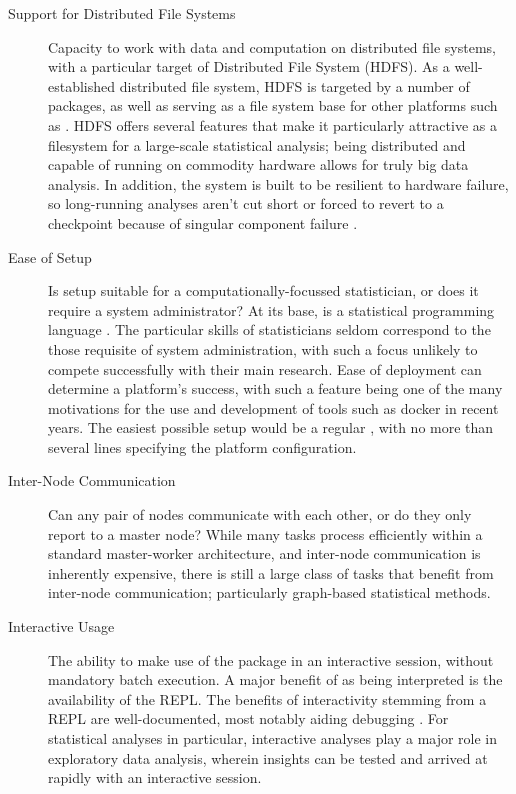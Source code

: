 \begin{description}
	\item[Support for Distributed File Systems]
		Capacity to work with data and computation on distributed file systems,
		with a particular target of 
		Distributed File System (HDFS).
		As a well-established distributed file system, HDFS is targeted by a number of \R{} packages, as well as serving as a file system base for other platforms such as  \cite{analytics:_rhadoop_wiki} \cite{deltarho:_rhipe}\cite{urbanek20}\cite{zaharia2016apache}.
		HDFS offers several features that make it particularly attractive as a filesystem for a large-scale statistical analysis; being distributed and capable of running on commodity hardware allows for truly big data analysis.
		In addition, the system is built to be resilient to hardware failure, so long-running analyses aren't cut short or forced to revert to a checkpoint because of singular component failure \cite{shvachko2010hadoop}.
	\item[Ease of Setup]
		Is setup suitable for a computationally-focussed statistician, or does
		it require a system administrator?
		At its base, \R{} is a statistical programming language \cite{rcore2020intro}.
		The particular skills of statisticians seldom correspond to the those requisite of system administration, with such a focus unlikely to compete successfully with their main research.
		Ease of deployment can determine a platform's success, with such a feature being one of the many motivations for the use and development of tools such as docker in recent years.
		The easiest possible setup would be a regular , with no more than several lines specifying the platform configuration.
	\item[Inter-Node Communication]
		Can any pair of nodes communicate with each other, or do they only
		report to a master node?
		While many tasks process efficiently within a standard master-worker architecture, and inter-node communication is inherently expensive, there is still a large class of tasks that benefit from inter-node communication\cite{walker1996mpi}; particularly graph-based statistical methods.
	\item[Interactive Usage]
		The ability to make use of the package in an interactive \R{} session,
		without mandatory batch execution.
		A major benefit of \R{} as being interpreted is the availability of the REPL.
		The benefits of interactivity stemming from a REPL are well-documented, most notably aiding debugging \cite{mccarthy1978history}.
		For statistical analyses in particular, interactive analyses play a major role in exploratory data analysis, wherein insights can be tested and arrived at rapidly with an interactive session.

\end{description}
